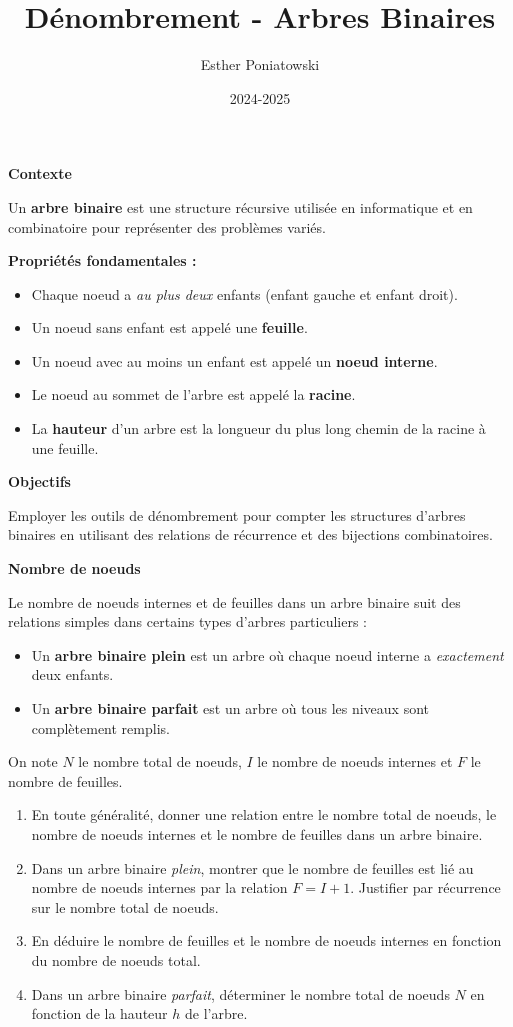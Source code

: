 \documentclass[10pt,a4paper]{article}
\title{Dénombrement - Arbres Binaires}
\author{Esther Poniatowski}
\date{2024-2025}
\begin{document}
\textbf{Contexte}

Un \textbf{arbre binaire} est une structure récursive utilisée en informatique et en combinatoire
pour représenter des problèmes variés.

\textbf{Propriétés fondamentales :}
\begin{itemize}
    \item Chaque noeud a  \textit{au plus deux} enfants (enfant gauche et enfant droit).
    \item Un noeud sans enfant est appelé une \textbf{feuille}.
    \item Un noeud avec au moins un enfant est appelé un \textbf{noeud interne}.
    \item Le noeud au sommet de l'arbre est appelé la \textbf{racine}.
    \item La \textbf{hauteur} d'un arbre est la longueur du plus long chemin de la racine à une
    feuille.
\end{itemize}

%

\bigskip
\textbf{Objectifs}

Employer les  outils de dénombrement pour compter les structures d'arbres binaires en utilisant
des relations de récurrence et des bijections combinatoires.

\q \textbf{Nombre de noeuds}

Le nombre de noeuds internes et de feuilles dans un arbre binaire suit des relations simples dans
certains types d'arbres particuliers :
\begin{itemize}
     \item Un \textbf{arbre binaire plein} est un arbre où chaque noeud interne a
    \textit{exactement} deux enfants.
    \item Un \textbf{arbre binaire parfait} est un arbre où tous les niveaux sont complètement
    remplis.
\end{itemize}
On note \( N \) le nombre total de noeuds, \( I \) le nombre de noeuds internes et \( F \) le nombre
de feuilles.

\begin{enumerate}
    \item En toute généralité, donner une relation entre le nombre total de noeuds, le nombre de
    noeuds internes et le nombre de feuilles dans un arbre binaire.
    \item Dans un arbre binaire \textit{plein}, montrer que le nombre de feuilles est lié au nombre
    de noeuds internes par la relation \( F = I + 1 \). Justifier par récurrence sur le nombre total
    de noeuds.
    \item En déduire le nombre de feuilles et le nombre de noeuds internes en fonction du nombre de
    noeuds total.
    \item Dans un arbre binaire \textit{parfait}, déterminer le nombre total de noeuds \( N \) en
    fonction de la hauteur \( h \) de l'arbre.
\end{enumerate}
\end{document}
